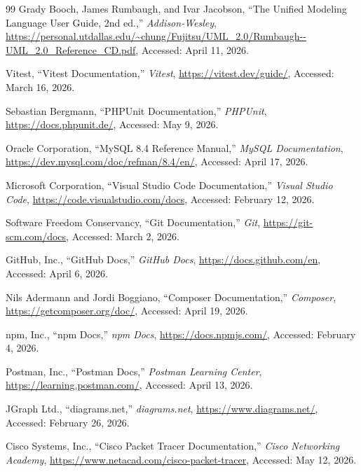 \begin{thebibliography}{99}
Grady Booch, James Rumbaugh, and Ivar Jacobson, ``The Unified Modeling Language User Guide, 2nd ed.,'' \textit{Addison-Wesley}, \url{https://personal.utdallas.edu/~chung/Fujitsu/UML_2.0/Rumbaugh--UML_2.0_Reference_CD.pdf}, Accessed: April 11, 2026.

Vitest, ``Vitest Documentation,'' \textit{Vitest}, \url{https://vitest.dev/guide/}, Accessed: March 16, 2026.

Sebastian Bergmann, ``PHPUnit Documentation,'' \textit{PHPUnit}, \url{https://docs.phpunit.de/}, Accessed: May 9, 2026.

Oracle Corporation, ``MySQL 8.4 Reference Manual,'' \textit{MySQL Documentation}, \url{https://dev.mysql.com/doc/refman/8.4/en/}, Accessed: April 17, 2026.

Microsoft Corporation, ``Visual Studio Code Documentation,'' \textit{Visual Studio Code}, \url{https://code.visualstudio.com/docs}, Accessed: February 12, 2026.

Software Freedom Conservancy, ``Git Documentation,'' \textit{Git}, \url{https://git-scm.com/docs}, Accessed: March 2, 2026.

GitHub, Inc., ``GitHub Docs,'' \textit{GitHub Docs}, \url{https://docs.github.com/en}, Accessed: April 6, 2026.

Nils Adermann and Jordi Boggiano, ``Composer Documentation,'' \textit{Composer}, \url{https://getcomposer.org/doc/}, Accessed: April 19, 2026.

npm, Inc., ``npm Docs,'' \textit{npm Docs}, \url{https://docs.npmjs.com/}, Accessed: February 4, 2026.

Postman, Inc., ``Postman Docs,'' \textit{Postman Learning Center}, \url{https://learning.postman.com/}, Accessed: April 13, 2026.

JGraph Ltd., ``diagrams.net,'' \textit{diagrams.net}, \url{https://www.diagrams.net/}, Accessed: February 26, 2026.

Cisco Systems, Inc., ``Cisco Packet Tracer Documentation,'' \textit{Cisco Networking Academy}, \url{https://www.netacad.com/cisco-packet-tracer}, Accessed: May 12, 2026.


\end{thebibliography}
